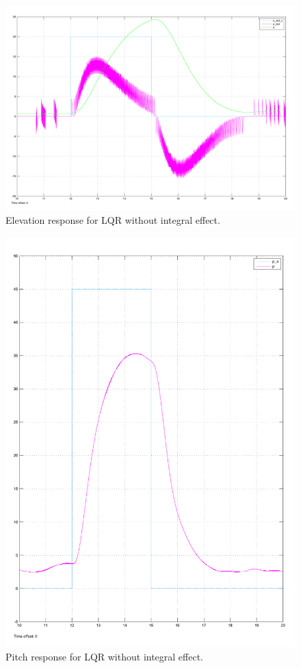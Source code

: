 \begin{figure}[!htb]
	\centering
	\includegraphics[width=\textwidth]{plots/P3p2_LQR_without_integral_elevation.pdf}
	\caption{Elevation response for LQR without integral effect.}
\label{fig:P3p2ElevWithoutIntegral}
\end{figure}

\begin{figure}[!htb]
	\centering
	\includegraphics[width=\textwidth]{plots/P3p2_LQR_without_integral_pitch.pdf}
	\caption{Pitch response for LQR without integral effect.}
\label{fig:P3p2PitchWithoutIntegral}
\end{figure}

